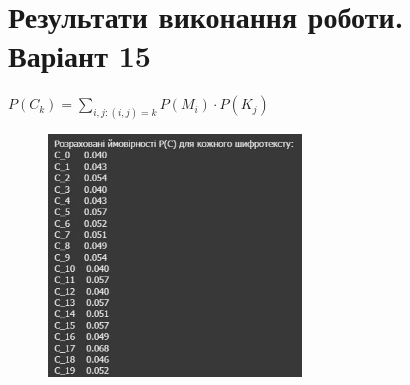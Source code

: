 \section{Результати виконання роботи. Варіант 15}
$P (C_{k}) = \sum\limits_{i, j : (i, j) = k} P(M_{i}) \cdot P(K_{j})$
\begin{figure}[!ht]
    \centering
    \begin{minipage}{0.6\linewidth}
        \includegraphics[width=0.6\textwidth, scale=0.05]{ReportPic/report_1.png}
    \end{minipage}
\end{figure}
\newpage

